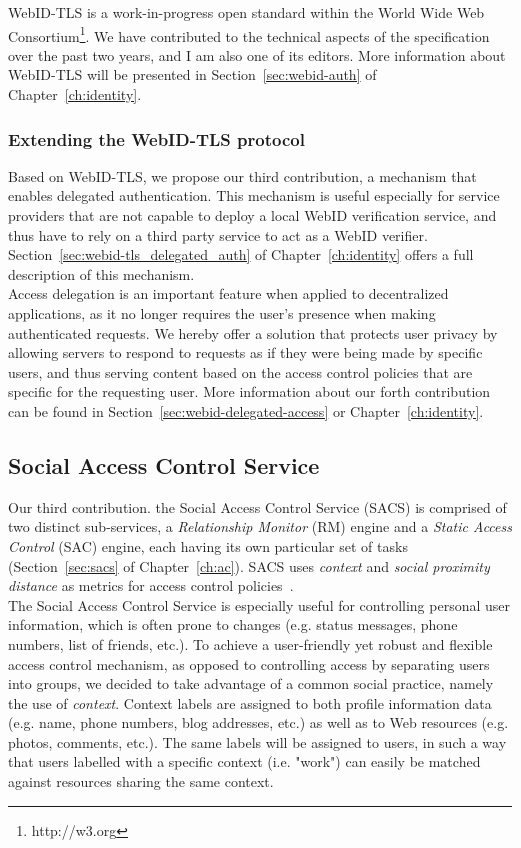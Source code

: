 WebID-TLS is a work-in-progress open standard within the World Wide Web Consortium\footnote{http://w3.org}. We have contributed to the technical aspects of the specification over the past two years, and I am also one of its editors.  More information about WebID-TLS will be presented in Section~\ref{sec:webid-auth} of Chapter~\ref{ch:identity}.

\subsubsection{Extending the WebID-TLS protocol}

Based on WebID-TLS, we propose our third contribution, a mechanism that enables delegated authentication. This mechanism is useful especially for service providers that are not capable to deploy a local WebID verification service, and thus have to rely on a third party service to act as a WebID verifier. Section~\ref{sec:webid-tls_delegated_auth} of Chapter~\ref{ch:identity} offers a full description of this mechanism.\\

Access delegation is an important feature when applied to decentralized applications, as it no longer requires the user's presence when making authenticated requests. We hereby offer a solution that protects user privacy by allowing servers to respond to requests as if they were being made by specific users, and thus serving content based on the access control policies that are specific for the requesting user. More information about our forth contribution can be found in Section~\ref{sec:webid-delegated-access} or Chapter~\ref{ch:identity}.


\subsection{Social Access Control Service}
Our third contribution. the Social Access Control Service (SACS) is comprised of two distinct sub-services, a \textit{Relationship Monitor} (RM) engine and a \textit{Static Access Control} (SAC) engine, each having its own particular set of tasks (Section~\ref{sec:sacs} of Chapter~\ref{ch:ac}). SACS uses \textit{context} and \textit{social proximity distance} as metrics for access control policies~\cite{sambra2012context}.\\

The Social Access Control Service is especially useful for controlling personal user information, which is often prone to changes (e.g. status messages, phone numbers, list of friends, etc.). To achieve a user-friendly yet robust and flexible access control mechanism, as opposed to controlling access by separating users into groups, we decided to take advantage of a common social practice, namely the use of \textit{context}. Context labels are assigned to both profile information data (e.g. name, phone numbers, blog addresses, etc.) as well as to Web resources (e.g. photos, comments, etc.). The same labels will be assigned to users, in such a way that users labelled with a specific context (i.e. "work") can easily be matched against resources sharing the same context. \\


